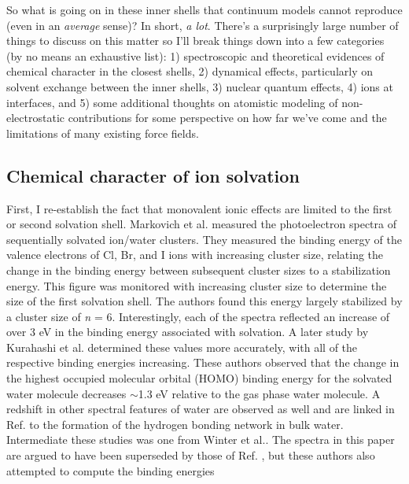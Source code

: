 \begin{intro}
   So what is going on in these inner shells that continuum models cannot reproduce (even in an \emph{average} sense)? In short, \emph{a lot}. There's a surprisingly large number
   of things to discuss on this matter so I'll break things down into a few categories (by no means an exhaustive list): 1) spectroscopic and theoretical evidences of chemical 
   character in the closest shells, 2) dynamical effects, particularly on solvent exchange between the inner shells, 3) nuclear quantum effects, 4) ions at interfaces, and 5) 
   some additional thoughts on atomistic modeling of non-electrostatic contributions for some perspective on how far we've come and the limitations of many existing force fields.
   
  \subsection{\label{ch1:sec3:level2}Chemical character of ion solvation}
   First, I re-establish the fact that monovalent ionic effects are limited to the first or second solvation shell. Markovich et al. measured the photoelectron spectra of 
   sequentially solvated ion/water clusters\cite{markovich1994photoelectron}. They measured the binding energy of the valence electrons of Cl\sur{-}, Br\sur{-}, and I\sur{-} ions
   with increasing cluster size, relating the change in the binding energy between subsequent cluster sizes to a stabilization energy. This figure was monitored with increasing
   cluster size to determine the size of the first solvation shell. The authors found this energy largely stabilized by a cluster size of \emph{n} = 6. Interestingly, each of the
   spectra reflected an increase of over 3 eV in the binding energy associated with solvation. A later study by Kurahashi et al. determined these values more accurately, with all
   of the respective binding energies increasing\cite{kurahashi2014photoelectron}. These authors observed that the change in the highest occupied molecular orbital (HOMO) binding 
   energy for the solvated water molecule decreases $\sim$1.3 eV relative to the gas phase water molecule. A redshift in other spectral features of water are observed as well and are
   linked in Ref. \cite{fransson2016x} to the formation of the hydrogen bonding network in bulk water. Intermediate these studies was one from Winter et al.\cite{winter2005electron}.
   The spectra in this paper are argued to have been superseded by those of Ref. \cite{kurahashi2014photoelectron}, but these authors also attempted to compute the binding energies

\end{intro}
